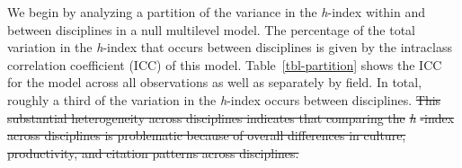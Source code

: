 \documentclass[
  10pt,
  letterpaper,
]{article}
\providecommand{\DIFdeltex}[1]{{\protect\color{red}\sout{#1}}}                      %
\providecommand{\DIFdelbegin}{} %
\providecommand{\DIFdelend}{} %
\providecommand{\DIFdel}[1]{\texorpdfstring{\DIFdeltex{#1}}{}} %
\newcommand{\DIFscaledelfig}{0.5}
\newlength{\DIFdelgraphicswidth} %
\newlength{\DIFdelgraphicsheight} %
\newcommand{\DIFdelincludegraphics}[2][]{%
\sbox{\DIFdelgraphicsbox}{\DIFOincludegraphics[#1]{#2}}%
\settoboxwidth{\DIFdelgraphicswidth}{\DIFdelgraphicsbox} %
\settoboxtotalheight{\DIFdelgraphicsheight}{\DIFdelgraphicsbox} %
\scalebox{\DIFscaledelfig}{%
\parbox[b]{\DIFdelgraphicswidth}{\usebox{\DIFdelgraphicsbox}\\[-\baselineskip] \rule{\DIFdelgraphicswidth}{0em}}\llap{\resizebox{\DIFdelgraphicswidth}{\DIFdelgraphicsheight}{%
\setlength{\unitlength}{\DIFdelgraphicswidth}%
\begin{picture}(1,1)%
\thicklines\linethickness{2pt} %
{\color[rgb]{1,0,0}\put(0,0){\framebox(1,1){}}}%
{\color[rgb]{1,0,0}\put(0,0){\line( 1,1){1}}}%
{\color[rgb]{1,0,0}\put(0,1){\line(1,-1){1}}}%
\end{picture}%
}\hspace*{3pt}}} %
} %
\DeclareRobustCommand{\DIFdelbegin}{\DIFOdelbegin \let\includegraphics\DIFdelincludegraphics} %
\DeclareRobustCommand{\DIFdelend}{\DIFOaddend \let\includegraphics\DIFOincludegraphics} %
\begin{document}
We begin by analyzing a partition of the variance in the \emph{h}-index
within and between disciplines in a null multilevel model. The
percentage of the total variation in the \emph{h}-index that occurs
between disciplines is given by the intraclass correlation coefficient
(ICC) of this model. Table~\ref{tbl-partition} shows the ICC for the
model across all observations as well as separately by field. In total,
roughly a third of the variation in the \emph{h}-index occurs between
disciplines.
\DIFdelbegin \DIFdel{This substantial heterogeneity across disciplines indicates
that comparing the }\emph{\DIFdel{h}}%
\DIFdel{-index across disciplines is problematic
because of overall differences in culture, productivity, and citation
patterns across disciplines.
}\DIFdelend 

\DIFdelbegin %
\end{document}
